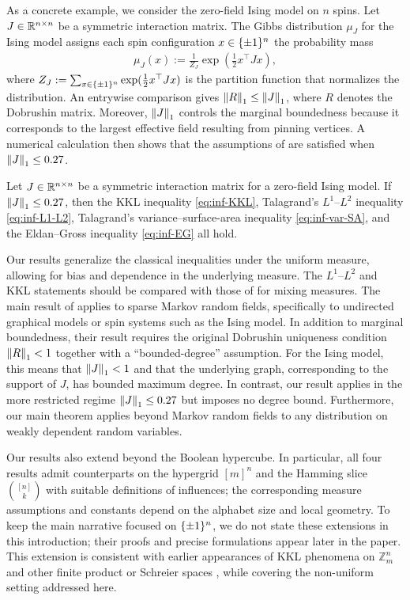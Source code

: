 As a concrete example, we consider the zero-field Ising model on $n$ spins. Let $J \in \mathbb{R}^{n \times n}$ be a symmetric interaction matrix. The Gibbs distribution $\mu_J$ for the Ising model assigns each spin configuration $x \in \{\pm 1\}^n$ the probability mass
\begin{align}\label{eq:Ising}
    \mu_J(x) := \frac{1}{Z_J} \exp\left( \frac{1}{2} x^\top J x \right),
\end{align}
where $Z_J := \sum_{x \in \{\pm 1\}^n} \exp(\frac{1}{2} x^\top J x)$ is the partition function that normalizes the distribution.
An entrywise comparison gives $\left\lVert R \right\rVert_1 \le \left\lVert J \right\rVert_1$, where $R$ denotes the Dobrushin matrix. 
Moreover, $\left\lVert J \right\rVert_1$ controls the marginal boundedness because it corresponds to the largest effective field resulting from pinning vertices.
A numerical calculation then shows that the assumptions of  are satisfied when $\left\lVert J \right\rVert_1 \le 0.27$.

\begin{corollary}
    Let $J \in \mathbb{R}^{n \times n}$ be a symmetric interaction matrix for a zero-field Ising model. If $\left\lVert J \right\rVert_1 \le 0.27$, then the KKL inequality \cref{eq:inf-KKL}, Talagrand's $L^1$--$L^2$ inequality \cref{eq:inf-L1-L2}, Talagrand's variance--surface-area inequality \cref{eq:inf-var-SA}, and the Eldan--Gross inequality \cref{eq:inf-EG} all hold.
\end{corollary}


Our results generalize the classical inequalities under the uniform measure, allowing for bias and dependence in the underlying measure. 
The $L^1$--$L^2$ and KKL statements should be compared with those of \cite{KoehlerLifshitzMinzerMossel23} for mixing measures. The main result of \cite{KoehlerLifshitzMinzerMossel23} applies to sparse Markov random fields, specifically to undirected graphical models or spin systems such as the Ising model.
In addition to marginal boundedness, their result requires the original Dobrushin uniqueness condition $\left\lVert R \right\rVert_1 < 1$ together with a ``bounded-degree'' assumption. For the Ising model, this means that $\left\lVert J \right\rVert_1 < 1$ and that the underlying graph, corresponding to the support of $J$, has bounded maximum degree. In contrast, our result applies in the more restricted regime $\left\lVert J \right\rVert_1 \le 0.27$ but imposes no degree bound. Furthermore, our main theorem  applies beyond Markov random fields to any distribution on weakly dependent random variables.

Our results also extend beyond the Boolean hypercube. In particular, all four results admit counterparts on the hypergrid $[m]^n$ and the Hamming slice $\binom{[n]}{k}$ with suitable definitions of influences; the corresponding measure assumptions and constants depend on the alphabet size and local geometry. To keep the main narrative focused on $\{\pm 1\}^n$, we do not state these extensions in this introduction; their proofs and precise formulations appear later in the paper. This extension is consistent with earlier appearances of KKL phenomena on $\mathbb Z_m^n$ and other finite product or Schreier spaces \cite{ODonnellWimmer13,ODonnellWimmerSharp13,CorderoErausquinLedoux12}, while covering the non-uniform setting addressed here.


